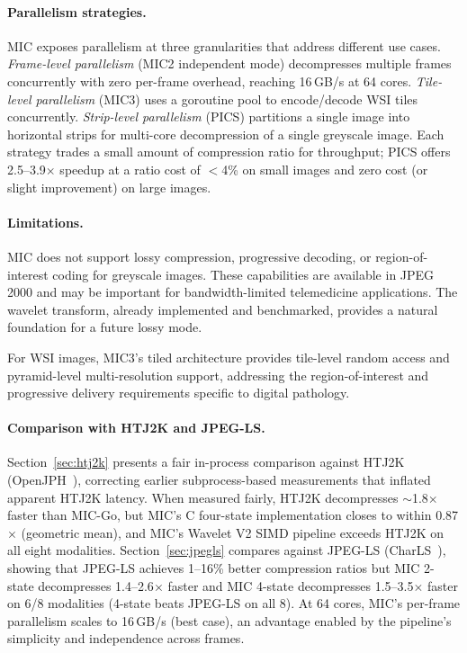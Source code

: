 \documentclass[11pt,twocolumn]{article}
\begin{document}
\paragraph{Parallelism strategies.}
MIC exposes parallelism at three granularities that address different use cases.
\emph{Frame-level parallelism} (MIC2 independent mode) decompresses multiple frames concurrently with zero per-frame overhead, reaching 16\,GB/s at 64 cores.
\emph{Tile-level parallelism} (MIC3) uses a goroutine pool to encode/decode WSI tiles concurrently.
\emph{Strip-level parallelism} (PICS) partitions a single image into horizontal strips for multi-core decompression of a single greyscale image.
Each strategy trades a small amount of compression ratio for throughput; PICS offers 2.5--3.9$\times$ speedup at a ratio cost of $<$4\% on small images and zero cost (or slight improvement) on large images.

\paragraph{Limitations.}
MIC does not support lossy compression, progressive decoding, or region-of-interest coding for greyscale images.
These capabilities are available in JPEG 2000 and may be important for bandwidth-limited telemedicine applications.
The wavelet transform, already implemented and benchmarked, provides a natural foundation for a future lossy mode.

For WSI images, MIC3's tiled architecture provides tile-level random access and pyramid-level multi-resolution support, addressing the region-of-interest and progressive delivery requirements specific to digital pathology.

\paragraph{Comparison with HTJ2K and JPEG-LS.}
Section~\ref{sec:htj2k} presents a fair in-process comparison against HTJ2K (OpenJPH~\cite{openjph}),
correcting earlier subprocess-based measurements that inflated apparent HTJ2K latency.
When measured fairly, HTJ2K decompresses $\sim$1.8$\times$ faster than MIC-Go, but MIC's C four-state
implementation closes to within 0.87$\times$ (geometric mean), and MIC's Wavelet V2 SIMD pipeline
exceeds HTJ2K on all eight modalities.
Section~\ref{sec:jpegls} compares against JPEG-LS (CharLS~\cite{charls}), showing that JPEG-LS
achieves 1--16\% better compression ratios but MIC 2-state decompresses 1.4--2.6$\times$ faster and
MIC 4-state decompresses 1.5--3.5$\times$ faster on 6/8 modalities (4-state beats JPEG-LS on all 8).
At 64 cores, MIC's per-frame parallelism scales to 16\,GB/s (best case), an advantage
enabled by the pipeline's simplicity and independence across frames.
\end{document}
